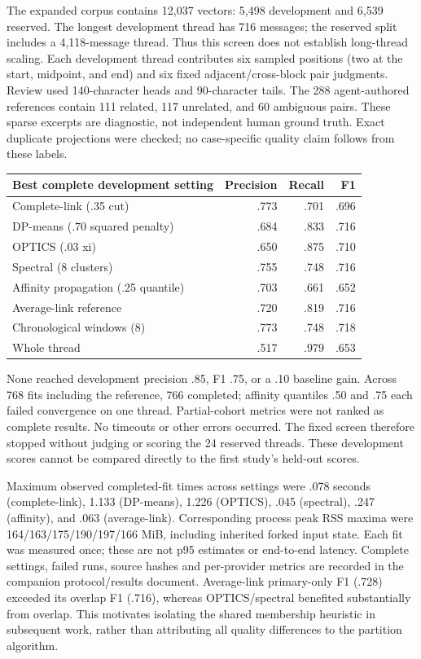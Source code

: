 \documentclass[11pt]{article}
\begin{document}
The expanded corpus contains 12,037 vectors: 5,498 development and 6,539 reserved.
The longest development thread has 716 messages; the reserved split includes a
4,118-message thread. Thus this screen does not establish long-thread scaling.
Each development thread contributes six sampled positions (two at the start,
midpoint, and end) and six fixed adjacent/cross-block pair judgments. Review used
140-character heads and 90-character tails. The 288 agent-authored references
contain 111 related, 117 unrelated, and 60 ambiguous pairs. These sparse excerpts
are diagnostic, not independent human ground truth. Exact duplicate projections
were checked; no case-specific quality claim follows from these labels.

\begin{center}
\begin{tabular}{lrrr}
\toprule
Best complete development setting & Precision & Recall & F1\\
\midrule
Complete-link (.35 cut) & .773 & .701 & .696\\
DP-means (.70 squared penalty) & .684 & .833 & .716\\
OPTICS (.03 xi) & .650 & .875 & .710\\
Spectral (8 clusters) & .755 & .748 & .716\\
Affinity propagation (.25 quantile) & .703 & .661 & .652\\
Average-link reference & .720 & .819 & .716\\
Chronological windows (8) & .773 & .748 & .718\\
Whole thread & .517 & .979 & .653\\
\bottomrule
\end{tabular}
\end{center}
None reached development precision .85, F1 .75, or a .10 baseline gain. Across
768 fits including the reference, 766 completed; affinity quantiles .50 and .75
each failed convergence on one thread. Partial-cohort metrics were not ranked as
complete results. No timeouts or other errors occurred. The fixed screen therefore
stopped without judging or scoring the 24 reserved threads. These development
scores cannot be compared directly to the first study's held-out scores.

Maximum observed completed-fit times across settings were .078 seconds
(complete-link), 1.133 (DP-means), 1.226 (OPTICS), .045 (spectral), .247
(affinity), and .063 (average-link). Corresponding process peak RSS maxima were
164/163/175/190/197/166 MiB, including inherited forked input state. Each fit was
measured once; these are not p95 estimates or end-to-end latency. Complete settings,
failed runs, source hashes and per-provider metrics are recorded in the companion
protocol/results document. Average-link primary-only F1 (.728) exceeded its overlap
F1 (.716), whereas OPTICS/spectral benefited substantially from overlap. This
motivates isolating the shared membership heuristic in subsequent work, rather
than attributing all quality differences to the partition algorithm.
\end{document}

